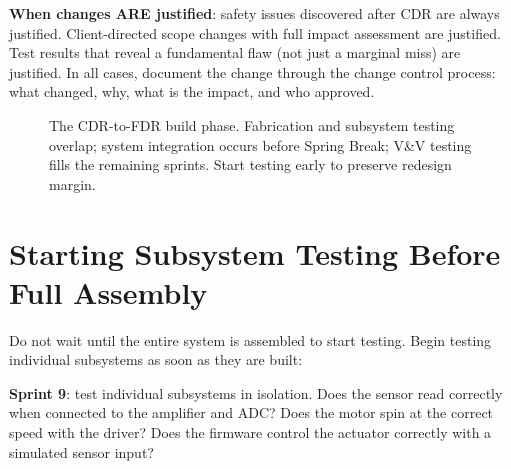 \textbf{When changes ARE justified}: safety issues discovered after CDR are always justified. Client-directed scope changes with full impact assessment are justified. Test results that reveal a fundamental flaw (not just a marginal miss) are justified. In all cases, document the change through the change control process: what changed, why, what is the impact, and who approved.


\begin{figure}[htbp]
\centering
{}
\caption{The CDR-to-FDR build phase. Fabrication and subsystem testing overlap; system integration occurs before Spring Break; V\&V testing fills the remaining sprints. Start testing early to preserve redesign margin.}\label{fig:build-timeline}
\end{figure}


\section{Starting Subsystem Testing Before Full Assembly}
Do not wait until the entire system is assembled to start testing. Begin testing individual subsystems as soon as they are built:

\textbf{Sprint 9}: test individual subsystems in isolation. Does the sensor read correctly when connected to the amplifier and ADC? Does the motor spin at the correct speed with the driver? Does the firmware control the actuator correctly with a simulated sensor input?

